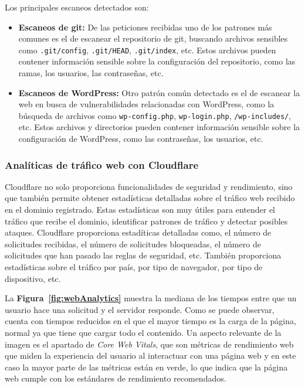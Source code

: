 Los principales escaneos detectados son:
\begin{itemize}
    \item \textbf{Escaneos de git:} De las peticiones recibidas uno de los patrones más comunes es el de escanear el repositorio de git, buscando archivos sensibles como \texttt{.git/config}, \texttt{.git/HEAD}, \texttt{.git/index}, etc. Estos archivos pueden contener información sensible sobre la configuración del repositorio, como las ramas, los usuarios, las contraseñas, etc.
    \item \textbf{Escaneos de WordPress:} Otro patrón común detectado es el de escanear la web en busca de vulnerabilidades relacionadas con WordPress, como la búsqueda de archivos como \texttt{wp-config.php}, \texttt{wp-login.php}, \texttt{/wp-includes/}, etc. Estos archivos y directorios pueden contener información sensible sobre la configuración de WordPress, como las contraseñas, los usuarios, etc.
\end{itemize}

\subsubsection{Analíticas de tráfico web con Cloudflare}

Cloudflare no solo proporciona funcionalidades de seguridad y rendimiento, sino que también permite obtener estadísticas detalladas sobre el tráfico web recibido en el dominio registrado. Estas estadísticas son muy útiles para entender el tráfico que recibe el dominio, identificar patrones de tráfico y detectar posibles ataques.
Cloudflare proporciona estadíticas detalladas como, el número de solicitudes recibidas, el número de solicitudes bloqueadas, el número de solicitudes que han pasado las reglas de seguridad, etc. También proporciona estadísticas sobre el tráfico por país, por tipo de navegador, por tipo de dispositivo, etc.



La \textbf{Figura~\ref{fig:webAnalytics}} muestra la mediana de los tiempos entre que un usuario hace una solicitud y el servidor responde.
Como se puede observar, cuenta con tiempos reducidos en el que el mayor tiempo es la carga de la página, normal ya que tiene que cargar todo el contenido. Un aspecto relevante de la imagen es el apartado de \textit{Core Web Vitals}, que son métricas de rendimiento web que miden la experiencia del usuario al interactuar con una página web y en este caso la mayor parte de las métricas están en verde, lo que indica que la página web cumple con los estándares de rendimiento recomendados.

